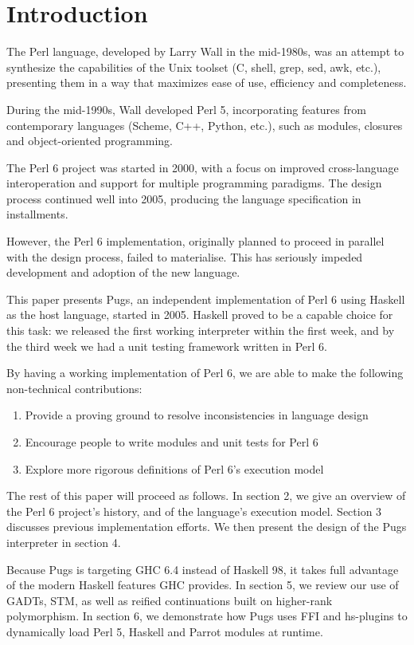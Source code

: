 \documentclass[]{sigplanconf}
\begin{document}
\section{Introduction}

The Perl language, developed by Larry Wall in the mid-1980s, was an attempt to
synthesize the capabilities of the Unix toolset (C, shell, grep, sed, awk,
etc.), presenting them in a way that maximizes ease of use, efficiency and
completeness.

During the mid-1990s, Wall developed Perl 5, incorporating features from
contemporary languages (Scheme, C++, Python, etc.), such as modules, closures
and object-oriented programming.

The Perl 6 project was started in 2000, with a focus on improved cross-language
interoperation and support for multiple programming paradigms.  The design
process continued well into 2005, producing the language specification in
installments.

However, the Perl 6 implementation, originally planned to proceed in parallel
with the design process, failed to materialise.  This has seriously impeded
development and adoption of the new language.

This paper presents Pugs, an independent implementation of Perl 6 using Haskell
as the host language, started in 2005.  Haskell proved to be a capable choice
for this task: we released the first working interpreter within the first week,
and by the third week we had a unit testing framework written in Perl 6.

By having a working implementation of Perl 6, we are able to make the following
non-technical contributions:

\begin{enumerate}
\item Provide a proving ground to resolve inconsistencies in language design
\item Encourage people to write modules and unit tests for Perl 6
\item Explore more rigorous definitions of Perl 6's execution model
\end{enumerate}

The rest of this paper will proceed as follows.  In section 2, we give an
overview of the Perl 6 project's history, and of the language's execution model.
Section 3 discusses previous implementation efforts.  We then present the
design of the Pugs interpreter in section 4.

Because Pugs is targeting GHC 6.4 instead of Haskell 98, it takes full
advantage of the modern Haskell features GHC provides.  In section 5, we review
our use of GADTs, STM, as well as reified continuations built on higher-rank
polymorphism.  In section 6, we demonstrate how Pugs uses FFI and hs-plugins to
dynamically load Perl 5, Haskell and Parrot modules at runtime.
\end{document}
